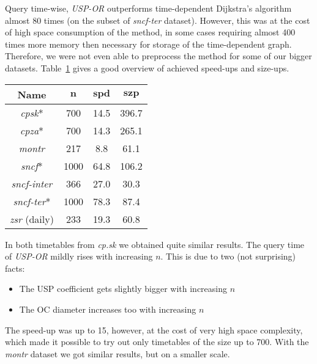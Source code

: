 		Query time-wise, \textit{USP-OR} outperforms time-dependent Dijkstra's algorithm almost 80 times (on the subset of \textit{sncf-ter} dataset). However, this was at the cost of high space consumption of the method, in some cases requiring almost 400 times more memory then necessary for storage of the time-dependent graph. Therefore, we were not even able to preprocess the method for some of our bigger datasets. Table~\ref{tab:uspor-speedup} gives a good overview of achieved speed-ups and size-ups.
	
		\begin{table}[H]
			\centering
			\begin{tabular}{c|c|c|c}
	            \rowcolor{tablehead}
	            \textbf{Name} & $\bm{n}$ & $\bm{spd}$ & $\bm{szp}$ \\
				\hline
				\textit{cpsk}* & 700 & 14.5 & 396.7 \\
				\textit{cpza}* & 700 & 14.3 & 265.1 \\
				\textit{montr} & 217 & 8.8 & 61.1\\
				\textit{sncf}* & 1000 & 64.8 & 106.2 \\
				\textit{sncf-inter} & 366 & 27.0 & 30.3 \\
				\textit{sncf-ter}* & 1000 & 78.3 & 87.4 \\
				\textit{zsr} (daily) & 233 & 19.3 & 60.8 \\
			\end{tabular}
			\label{tab:uspor-speedup}
		\end{table}
	
		\noindent In both timetables from \textit{cp.sk} we obtained quite similar results. The query time of \textit{USP-OR} mildly rises with increasing $n$. This is due to two (not surprising) facts: 
		\begin{itemize}
			\item The USP coefficient gets slightly bigger with increasing $n$
			\item The OC diameter increases too with increasing $n$
		\end{itemize}
		\hspace{\fill}
		
		\noindent The speed-up was up to 15, however, at the cost of very high space complexity, which made it possible to try out only timetables of the size up to 700. With the \textit{montr} dataset we got similar results, but on a smaller scale.
		
